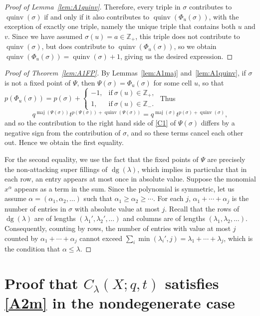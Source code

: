\documentclass[11pt]{article}
\theoremstyle{definition}
\numberwithin{equation}{section}
\DeclareMathOperator{\dg}{dg}
\DeclareMathOperator{\maj}{maj}
\DeclareMathOperator{\quinv}{quinv}
\begin{document}
\begin{proof}[Proof of Lemma~\ref{lem:A1quinv}]
Therefore, every triple in $\sigma$ contributes to $\quinv(\sigma)$ if and only if it also contributes to $\quinv(\Phi_u(\sigma))$, with the exception of exactly one triple, namely the unique triple that contains both $u$ and $v$. Since we have assumed $\sigma(u)=a\in\mathbb{Z}_+$, this triple does not contribute to $\quinv(\sigma)$, but does contribute to $\quinv(\Phi_u(\sigma))$, so we obtain $\quinv(\Phi_u(\sigma))=\quinv(\sigma)+1$, giving us the desired expression.
\end{proof}

\begin{proof}[Proof of Theorem~\ref{lem:A1FP}]
By Lemmas~\ref{lem:A1maj} and~\ref{lem:A1quinv}, if $\sigma$ is not a fixed point of $\Psi$, then $\Psi(\sigma)=\Phi_u(\sigma)$ for some cell $u$, so that $p(\Phi_u(\sigma)) = p(\sigma)+\begin{cases}-1, & \mbox{if}\ \sigma(u)\in\mathbb{Z}_+,\\1, & \mbox{if}\ \sigma(u)\in\mathbb{Z}_-.\end{cases}$ Thus 
\[
q^{\maj(\Psi(\sigma))}t^{p(\Psi(\sigma))+\quinv(\Psi(\sigma))} = q^{\maj(\sigma)}t^{p(\sigma)+\quinv(\sigma)},
\] 
and so the contribution to the right hand side of \eqref{C1} of $\Psi(\sigma)$ differs by a negative sign from the contribution of $\sigma$, and so these terms cancel each other out. Hence we obtain the first equality.

For the second equality, we use the fact that the fixed points of $\Psi$ are precisely the non-attacking super fillings of $\dg(\lambda)$, which implies in particular that in each row, an entry appears at most once in absolute value. Suppose the monomial $x^{\alpha}$ appears as a term in the sum. Since the polynomial is symmetric, let us assume $\alpha=(\alpha_1,\alpha_2,\ldots)$ such that $\alpha_1\geq \alpha_2 \geq \cdots$. For each $j$, $\alpha_1+\cdots+\alpha_j$ is the number of entries in $\sigma$ with absolute value at most $j$. Recall that the rows of $\dg(\lambda)$ are of lengths $(\lambda_1',\lambda_2',\ldots)$ and columns are of lengths $(\lambda_1,\lambda_2,\ldots)$. Consequently, counting by rows, the number of entries with value at most $j$ counted by $\alpha_1+\cdots+\alpha_j$ cannot exceed $\sum_i \min(\lambda_i',j) = \lambda_1+\cdots+\lambda_j$, which is the condition that $\alpha \leq \lambda$. 
\end{proof}

\section{Proof that $C_{\lambda}(X;q,t)$ satisfies \eqref{A2m} in the nondegenerate case}
\label{sec:A2m}
\end{document}
